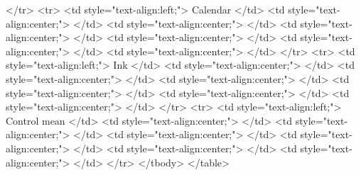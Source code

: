   </tr>
  <tr>
   <td style="text-align:left;"> Calendar </td>
   <td style="text-align:center;">  </td>
   <td style="text-align:center;">  </td>
   <td style="text-align:center;">  </td>
   <td style="text-align:center;">  </td>
   <td style="text-align:center;">  </td>
   <td style="text-align:center;">  </td>
  </tr>
  <tr>
   <td style="text-align:left;"> Ink </td>
   <td style="text-align:center;">  </td>
   <td style="text-align:center;">  </td>
   <td style="text-align:center;">  </td>
   <td style="text-align:center;">  </td>
   <td style="text-align:center;">  </td>
   <td style="text-align:center;">  </td>
  </tr>
  <tr>
   <td style="text-align:left;"> Control mean </td>
   <td style="text-align:center;">  </td>
   <td style="text-align:center;">  </td>
   <td style="text-align:center;">  </td>
   <td style="text-align:center;">  </td>
   <td style="text-align:center;">  </td>
   <td style="text-align:center;">  </td>
  </tr>
</tbody>
</table>
